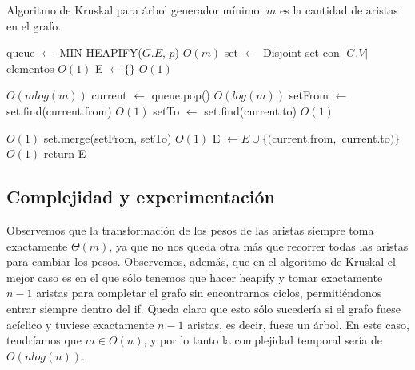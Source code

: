 \documentclass{article}
\theoremstyle{definition}
\theoremstyle{remark}
\begin{document}
\begin{algorithm}[h!]
\caption{Algoritmo de Kruskal para árbol generador mínimo. $m$ es la cantidad de aristas en el grafo. \label{alg:kruskal}}

\begin{algorithmic}[h!]
\State queue $\gets$ MIN-HEAPIFY($G.E$, $p$) \Comment $O(m)$
\State set $\gets$ Disjoint set con $|G.V|$ elementos \Comment $O(1)$
\State E $\gets \{\}$ \Comment $O(1)$

 \Comment $O(m log(m))$
\State current $\gets$ queue.pop() \Comment $O(log(m))$
\State setFrom $\gets$ set.find(current.from) \Comment $O(1)$
\State setTo $\gets$ set.find(current.to) \Comment $O(1)$

 \Comment $O(1)$
\State set.merge(setFrom, setTo) \Comment $O(1)$
\State E $\gets E \cup \{($current.from$,$ current.to$)\}$ \Comment $O(1)$
\EndIf
\EndWhile
\State return E
\EndProcedure
\end{algorithmic}
\end{algorithm}

\subsection{Complejidad y experimentación}

Observemos que la transformación de los pesos de las aristas siempre toma exactamente $\Theta(m)$, ya que no nos queda otra más que recorrer todas las aristas para cambiar los pesos. Observemos, además, que en el algoritmo de Kruskal el mejor caso es en el que sólo tenemos que hacer heapify y tomar exactamente $n - 1$ aristas para completar el grafo sin encontrarnos ciclos, permitiéndonos entrar siempre dentro del if. Queda claro que esto sólo sucedería si el grafo fuese acíclico y tuviese exactamente $n - 1$ aristas, es decir, fuese un árbol. En este caso, tendríamos que $m \in O(n)$, y por lo tanto la complejidad temporal sería de $O(n log(n))$.
\end{document}
